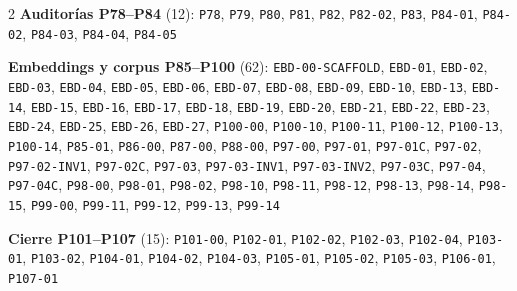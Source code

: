 \begin{multicols}{2}
\noindent\textbf{Auditorías P78--P84} (12): \texttt{P78}, \texttt{P79}, \texttt{P80}, \texttt{P81}, \texttt{P82}, \texttt{P82-\allowbreak{}02}, \texttt{P83}, \texttt{P84-\allowbreak{}01}, \texttt{P84-\allowbreak{}02}, \texttt{P84-\allowbreak{}03}, \texttt{P84-\allowbreak{}04}, \texttt{P84-\allowbreak{}05}\par\smallskip
\noindent\textbf{Embeddings y corpus P85--P100} (62): \texttt{EBD-\allowbreak{}00-\allowbreak{}SCAFFOLD}, \texttt{EBD-\allowbreak{}01}, \texttt{EBD-\allowbreak{}02}, \texttt{EBD-\allowbreak{}03}, \texttt{EBD-\allowbreak{}04}, \texttt{EBD-\allowbreak{}05}, \texttt{EBD-\allowbreak{}06}, \texttt{EBD-\allowbreak{}07}, \texttt{EBD-\allowbreak{}08}, \texttt{EBD-\allowbreak{}09}, \texttt{EBD-\allowbreak{}10}, \texttt{EBD-\allowbreak{}13}, \texttt{EBD-\allowbreak{}14}, \texttt{EBD-\allowbreak{}15}, \texttt{EBD-\allowbreak{}16}, \texttt{EBD-\allowbreak{}17}, \texttt{EBD-\allowbreak{}18}, \texttt{EBD-\allowbreak{}19}, \texttt{EBD-\allowbreak{}20}, \texttt{EBD-\allowbreak{}21}, \texttt{EBD-\allowbreak{}22}, \texttt{EBD-\allowbreak{}23}, \texttt{EBD-\allowbreak{}24}, \texttt{EBD-\allowbreak{}25}, \texttt{EBD-\allowbreak{}26}, \texttt{EBD-\allowbreak{}27}, \texttt{P100-\allowbreak{}00}, \texttt{P100-\allowbreak{}10}, \texttt{P100-\allowbreak{}11}, \texttt{P100-\allowbreak{}12}, \texttt{P100-\allowbreak{}13}, \texttt{P100-\allowbreak{}14}, \texttt{P85-\allowbreak{}01}, \texttt{P86-\allowbreak{}00}, \texttt{P87-\allowbreak{}00}, \texttt{P88-\allowbreak{}00}, \texttt{P97-\allowbreak{}00}, \texttt{P97-\allowbreak{}01}, \texttt{P97-\allowbreak{}01C}, \texttt{P97-\allowbreak{}02}, \texttt{P97-\allowbreak{}02-\allowbreak{}INV1}, \texttt{P97-\allowbreak{}02C}, \texttt{P97-\allowbreak{}03}, \texttt{P97-\allowbreak{}03-\allowbreak{}INV1}, \texttt{P97-\allowbreak{}03-\allowbreak{}INV2}, \texttt{P97-\allowbreak{}03C}, \texttt{P97-\allowbreak{}04}, \texttt{P97-\allowbreak{}04C}, \texttt{P98-\allowbreak{}00}, \texttt{P98-\allowbreak{}01}, \texttt{P98-\allowbreak{}02}, \texttt{P98-\allowbreak{}10}, \texttt{P98-\allowbreak{}11}, \texttt{P98-\allowbreak{}12}, \texttt{P98-\allowbreak{}13}, \texttt{P98-\allowbreak{}14}, \texttt{P98-\allowbreak{}15}, \texttt{P99-\allowbreak{}00}, \texttt{P99-\allowbreak{}11}, \texttt{P99-\allowbreak{}12}, \texttt{P99-\allowbreak{}13}, \texttt{P99-\allowbreak{}14}\par\smallskip
\noindent\textbf{Cierre P101--P107} (15): \texttt{P101-\allowbreak{}00}, \texttt{P102-\allowbreak{}01}, \texttt{P102-\allowbreak{}02}, \texttt{P102-\allowbreak{}03}, \texttt{P102-\allowbreak{}04}, \texttt{P103-\allowbreak{}01}, \texttt{P103-\allowbreak{}02}, \texttt{P104-\allowbreak{}01}, \texttt{P104-\allowbreak{}02}, \texttt{P104-\allowbreak{}03}, \texttt{P105-\allowbreak{}01}, \texttt{P105-\allowbreak{}02}, \texttt{P105-\allowbreak{}03}, \texttt{P106-\allowbreak{}01}, \texttt{P107-\allowbreak{}01}\par\smallskip

\end{multicols}

